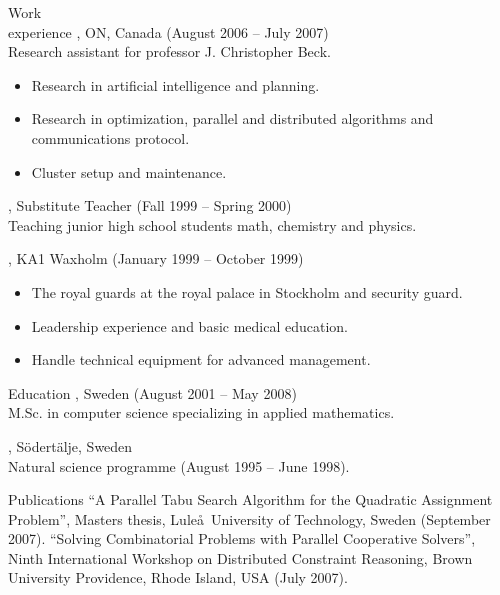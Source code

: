 \documentclass{../../cls/cv}
\begin{document}
\begin{category}{Work \\experience}
, ON, Canada (August 2006 -- July 2007) \\
Research assistant for professor J. Christopher Beck.
\begin{itemize}
   \item Research in artificial intelligence and planning.
   \item Research in optimization, parallel and distributed algorithms and communications protocol.
   \item Cluster setup and maintenance.
\end{itemize}


, Substitute Teacher (Fall 1999 -- Spring 2000) \\
Teaching junior high school students math, chemistry and physics.

, KA1 Waxholm (January 1999 -- October 1999)
\begin{itemize}
   \item The royal guards at the royal palace in Stockholm and security guard.
   \item Leadership experience and basic medical education.
   \item Handle technical equipment for advanced management.
\end{itemize}
\end{category}

\begin{category}{Education}
, Sweden (August 2001 -- May 2008)\\
M.Sc. in computer science specializing in applied mathematics.

, S\"odert\"alje, Sweden\\
Natural science programme (August 1995 -- June 1998).
\end{category}

\begin{category}{Publications}
\citembullet ``A Parallel Tabu Search Algorithm for the Quadratic Assignment Problem'', Masters thesis, Lule\aa\ University of Technology, Sweden (September 2007).
\citembullet ``Solving Combinatorial Problems with Parallel Cooperative Solvers'', Ninth International
Workshop on Distributed Constraint Reasoning, Brown University Providence, Rhode Island, USA (July 2007).
\end{category}
\end{document}

